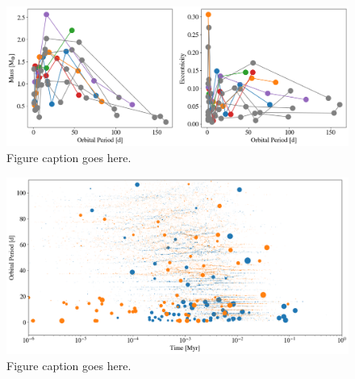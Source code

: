 \begin{figure}
\begin{center}
    \includegraphics[width=\textwidth]{figures/stip/per_mass_ecc_syn_comp.png}
    \caption{Figure caption goes here.\label{fig:per_mass_ecc_syn_comp}}
\end{center}
\end{figure}

\begin{figure}
\begin{center}
    \includegraphics[width=\textwidth]{figures/stip/full_coll_syn_comp.png}
    \caption{Figure caption goes here.\label{fig:full_coll_syn_comp}}
\end{center}
\end{figure}

